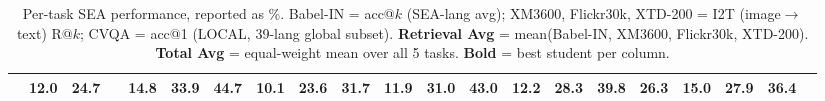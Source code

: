 \documentclass[11pt]{article}
\begin{document}
\begin{table}[h!]
{\begin{tabular}{l c ccc ccc ccc ccc ccc c ccc}
  & 12.0 & 24.7 & \text{---} & \textbf{14.8} & \textbf{33.9} & \textbf{44.7} & 10.1 & 23.6 & \textbf{31.7} & 11.9 & \textbf{31.0} & \textbf{43.0} & 12.2 & \textbf{28.3} & \textbf{39.8} & 26.3 & 15.0 & \textbf{27.9} & \textbf{36.4} \\
\bottomrule\end{tabular}
}
\caption{Per-task SEA performance, reported as \%.
  Babel-IN = acc@$k$ (SEA-lang avg); XM3600, Flickr30k, XTD-200 = I2T (image$\to$text) R@$k$;
  CVQA = acc@1 (LOCAL, 39-lang global subset).
  \textbf{Retrieval Avg} = mean(Babel-IN, XM3600, Flickr30k, XTD-200).
  \textbf{Total Avg} = equal-weight mean over all 5 tasks.
  \textbf{Bold} = best student per column.}
\label{tab:per_task_rk_i2t}
\end{table}
\end{document}
